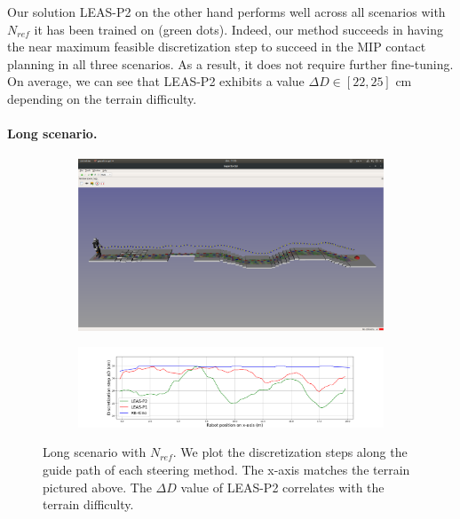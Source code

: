 Our solution LEAS-P2 on the other hand performs well across all scenarios with $N_{ref}$ it has been trained on (green dots).
Indeed, our method succeeds in having the near maximum feasible discretization step to succeed in the MIP contact planning in all three scenarios. As a result, it does not require further fine-tuning.
On average, we can see that LEAS-P2 exhibits a value $\Delta D \in [22, 25]$ cm depending on the terrain difficulty.


\paragraph{Long scenario.}
\begin{figure}[ht]
    \centering
    \captionsetup[subfigure]{justification=centering}
    \begin{subfigure}[t]{0.9\linewidth}
        \includegraphics[trim={1cm 12cm 1cm 15cm}, clip,width=\textwidth]{Figures/Chapter_MIP_SL1M/1x11_guide_all_surf_steps.png}
    \end{subfigure}
    \begin{subfigure}[t]{0.9\linewidth}
        \includegraphics[trim={4cm 0cm 3.5cm 1.65cm}, clip,width=\textwidth]{Figures/Chapter_MIP_SL1M/res_mip/Long_discr_x_axis.png}
    \end{subfigure}
    \caption{Long scenario with $N_{ref}$. We plot the discretization steps along the guide path of each steering method. The x-axis matches the terrain pictured above. The $\Delta D$ value of LEAS-P2 correlates with the terrain difficulty.}
    \label{fig:mip:long_range}
\end{figure}

